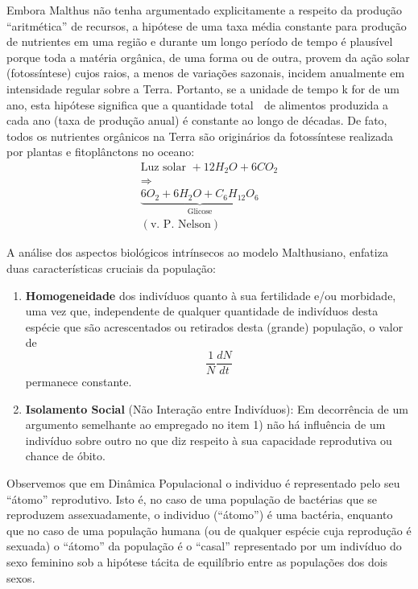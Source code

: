     Embora Malthus não tenha argumentado explicitamente a respeito da produção ``aritmética'' de recursos, a hipótese de uma taxa média constante para produção de nutrientes em uma região e durante um longo período de tempo é plausível porque toda a matéria orgânica, de uma forma ou de outra, provem da ação solar (fotossíntese) cujos raios, a menos de variações sazonais, incidem anualmente em intensidade regular sobre a Terra. Portanto, se a unidade de tempo k for de um ano, esta hipótese significa que a quantidade total  de alimentos produzida a cada ano (taxa de produção anual) é constante ao longo de décadas. De fato, todos os nutrientes orgânicos na Terra são originários da fotossíntese realizada por plantas e fitoplânctons no oceano:
    \[\begin{array}{c}
    \mbox{Luz solar } + 12 H_2O + 6 CO_2 \\
    \Rightarrow \\
    \underbrace{6O_2 + 6 H_2O + C_6H_{12}O_6}_{\mbox{Glicose}} \\[0.5cm]
    (\mbox{v. P. Nelson})
    \end{array}\]

    A análise dos aspectos biológicos intrínsecos ao modelo Malthusiano, enfatiza duas características cruciais da população:
    \begin{enumerate}
    \item \textbf{Homogeneidade} dos indivíduos quanto à sua fertilidade e/ou morbidade, uma vez que, independente de qualquer quantidade de indivíduos desta espécie que são acrescentados ou retirados desta (grande) população, o valor de
    \[\dfrac{1}{N} \dfrac{dN}{dt}\]
    permanece constante.
    \item \textbf{Isolamento Social} (Não Interação entre Indivíduos): Em decorrência de um argumento semelhante ao empregado no item 1) não há influência de um indivíduo sobre outro no que diz respeito à sua capacidade reprodutiva ou chance de óbito.
    \end{enumerate}


    Observemos que em Dinâmica Populacional o individuo é representado pelo seu ``átomo'' reprodutivo. Isto é, no caso de uma população de bactérias que se reproduzem assexuadamente, o individuo (``átomo'') é uma bactéria, enquanto que no caso de uma população humana (ou de qualquer espécie cuja reprodução é sexuada) o ``átomo'' da população é o ``casal'' representado por um indivíduo do sexo feminino sob a hipótese tácita de equilíbrio entre as populações dos dois sexos. 


